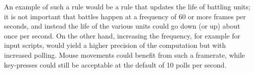 An example of such a rule would be a rule that updates the life of battling units; it is not important that battles happen at a frequency of 60 or more frames per seconds, and instead the life of the various units could go down (or up) about once per second. On the other hand, increasing the frequency, for example for input scripts, would yield a higher precision of the computation but with increased polling. Mouse movements could benefit from such a framerate, while key-presses could still be acceptable at the default of 10 polls per second. 
